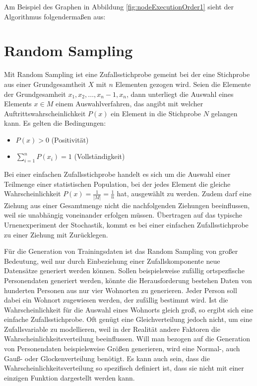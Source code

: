 Am Beispiel des Graphen in Abbildung \ref{fig:nodeExecutionOrder1} sieht der Algorithmus folgendermaßen aus:

\todo

\section{Random Sampling}

Mit Random Sampling ist eine Zufallsstichprobe gemeint bei der eine Stichprobe aus einer Grundgesamtheit $X$ mit $n$ Elementen gezogen wird. Seien die Elemente der Grundgesamheit $x_1,x_2,\dots,x_n-1,x_n$, dann unterliegt die Auswahl eines Elements $x \in M$ einem Auswahlverfahren, das angibt mit welcher Auftrittswahrscheinlichkeit $P(x)$ ein Element in die Stichprobe $N$ gelangen kann.
Es gelten die Bedingungen:
\begin{itemize}
    \item $P(x) > 0$ (Positivität)
    \item $\sum_{i=1}^{n}P(x_i)=1$ (Vollständigkeit)
\end{itemize}

Bei einer einfachen Zufallsstichprobe handelt es sich um die Auswahl einer Teilmenge einer statistischen Population, bei der jedes Element die gleiche Wahrscheinlichkeit $P(x)=\frac{1}{\lvert M \rvert}=\frac{1}{n}$ hat, ausgewählt zu werden. Zudem darf eine Ziehung aus einer Gesamtmenge nicht die nachfolgenden Ziehungen beeinflussen, weil sie unabhängig voneinander erfolgen müssen. Übertragen auf das typische Urnenexperiment der Stochastik, kommt es bei einer einfachen Zufallsstichprobe zu einer Ziehung mit Zurücklegen.

Für die Generation von Trainingsdaten ist das Random Sampling von großer Bedeutung, weil nur durch Einbeziehung einer Zufallskomponente neue Datensätze generiert werden können. Sollen beispielsweise zufällig ortspezfische Personendaten generiert werden, könnte die Herausforderung bestehen Daten von hunderten Personen aus nur vier Wohnorten zu generieren. Jeder Person soll dabei ein Wohnort zugewiesen werden, der zufällig bestimmt wird. Ist die Wahrscheinlichkeit für die Auswahl eines Wohnorts gleich groß, so ergibt sich eine einfache Zufallsstichprobe.
Oft genügt eine Gleichverteilung jedoch nicht, um eine Zufallsvariable zu modellieren, weil in der Realität andere Faktoren die Wahrscheinlichkeitsverteilung beeinflussen. Will man bezogen auf die Generation von Personendaten beispielsweise Größen generieren, wird eine Normal-, auch Gauß- oder Glockenverteilung benötigt.
Es kann auch sein, dass die Wahrscheinlichkeitsverteilung so spezifisch definiert ist, dass sie nicht mit einer einzigen Funktion dargestellt werden kann.

